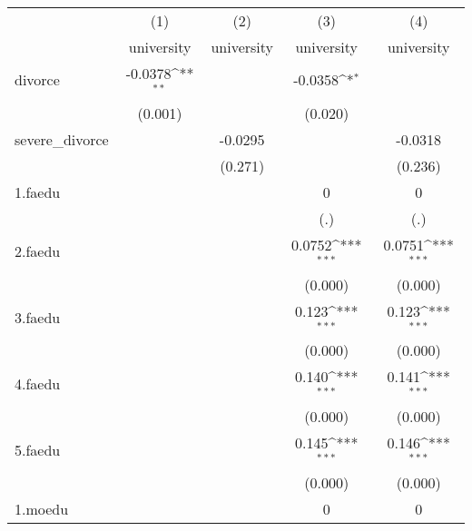 {
\def\sym#1{\ifmmode^{#1}\else\(^{#1}\)\fi}
\begin{tabular}{l*{4}{c}}
\hline\hline
            &\multicolumn{1}{c}{(1)}&\multicolumn{1}{c}{(2)}&\multicolumn{1}{c}{(3)}&\multicolumn{1}{c}{(4)}\\
            &\multicolumn{1}{c}{university}&\multicolumn{1}{c}{university}&\multicolumn{1}{c}{university}&\multicolumn{1}{c}{university}\\
\hline
divorce     &     -0.0378\sym{**} &                     &     -0.0358\sym{*}  &                     \\
            &     (0.001)         &                     &     (0.020)         &                     \\
[1em]
severe\_divorce&                     &     -0.0295         &                     &     -0.0318         \\
            &                     &     (0.271)         &                     &     (0.236)         \\
[1em]
1.faedu     &                     &                     &           0         &           0         \\
            &                     &                     &         (.)         &         (.)         \\
[1em]
2.faedu     &                     &                     &      0.0752\sym{***}&      0.0751\sym{***}\\
            &                     &                     &     (0.000)         &     (0.000)         \\
[1em]
3.faedu     &                     &                     &       0.123\sym{***}&       0.123\sym{***}\\
            &                     &                     &     (0.000)         &     (0.000)         \\
[1em]
4.faedu     &                     &                     &       0.140\sym{***}&       0.141\sym{***}\\
            &                     &                     &     (0.000)         &     (0.000)         \\
[1em]
5.faedu     &                     &                     &       0.145\sym{***}&       0.146\sym{***}\\
            &                     &                     &     (0.000)         &     (0.000)         \\
[1em]
1.moedu     &                     &                     &           0         &           0         \\

\end{tabular}}
